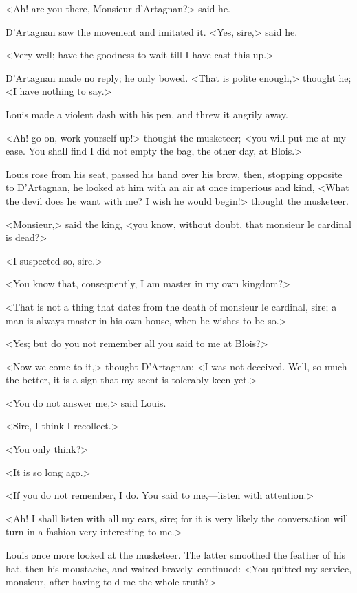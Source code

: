 <Ah! are you there, Monsieur d'Artagnan?> said he.

D'Artagnan saw the movement and imitated it. <Yes, sire,> said he.

<Very well; have the goodness to wait till I have cast this up.>

D'Artagnan made no reply; he only bowed. <That is polite enough,> thought he; <I have nothing to say.>

Louis made a violent dash with his pen, and threw it angrily away.

<Ah! go on, work yourself up!> thought the musketeer; <you will put me at my ease. You shall find I did not empty the bag, the other day, at Blois.>

Louis rose from his seat, passed his hand over his brow, then, stopping opposite to D'Artagnan, he looked at him with an air at once imperious and kind, <What the devil does he want with me? I wish he would begin!> thought the musketeer.

<Monsieur,> said the king, <you know, without doubt, that monsieur le cardinal is dead?>

<I suspected so, sire.>

<You know that, consequently, I am master in my own kingdom?>

<That is not a thing that dates from the death of monsieur le cardinal, sire; a man is always master in his own house, when he wishes to be so.>

<Yes; but do you not remember all you said to me at Blois?>

<Now we come to it,> thought D'Artagnan; <I was not deceived. Well, so much the better, it is a sign that my scent is tolerably keen yet.>

<You do not answer me,> said Louis.

<Sire, I think I recollect.>

<You only think?>

<It is so long ago.>

<If you do not remember, I do. You said to me,—listen with attention.>

<Ah! I shall listen with all my ears, sire; for it is very likely the conversation will turn in a fashion very interesting to me.>

Louis once more looked at the musketeer. The latter smoothed the feather of his hat, then his moustache, and waited bravely.  continued: <You quitted my service, monsieur, after having told me the whole truth?>

